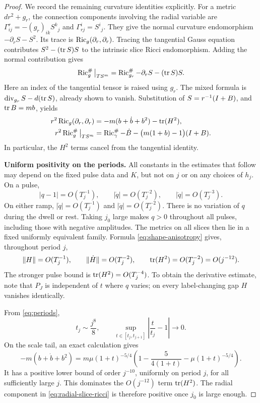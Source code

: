 \begin{proof}
We record the remaining curvature identities explicitly.
For a metric \(dr^2+g_r\), the connection components involving the
radial variable are
\(\Gamma^r_{ij}=-(g_r)_{ik}S^k{}_j\) and
\(\Gamma^i_{rj}=S^i{}_j\).
They give the normal curvature endomorphism
\(-\partial_rS-S^2\).  Its trace is \(\operatorname{Ric}_g(\partial_r,\partial_r)\).
Tracing the tangential Gauss equation contributes
\(S^2-(\operatorname{tr} S)S\) to the intrinsic slice Ricci endomorphism.
Adding the normal contribution gives
\[
 \operatorname{Ric}_g^\#\big|_{TS^m}
   =\operatorname{Ric}_{g_r}^\#-\partial_rS-(\operatorname{tr} S)S.
\]
Here an index of the tangential tensor is raised using \(g_r\).
The mixed formula is
\(\operatorname{div}_{g_r}S-d(\operatorname{tr} S)\), already shown to vanish.
Substitution of \(S=r^{-1}(I+B)\), and
\(\operatorname{tr} B=mb\), yields
\begin{equation}\label{eq:radial-slice-ricci}
 \begin{aligned}
  r^2\operatorname{Ric}_g(\partial_r,\partial_r)
     &=-m(b+\dot b+b^2)-\operatorname{tr}(H^2),\\
  r^2\operatorname{Ric}_g^\#\big|_{TS^m}
     &=\operatorname{Ric}_\gamma^\#-\dot B
       -\bigl(m(1+b)-1\bigr)(I+B).
 \end{aligned}
\end{equation}
In particular, the \(H^2\) terms cancel from the tangential identity.

\medskip\noindent
\textbf{Uniform positivity on the periods.}
All constants in the estimates that follow may depend on the fixed
pulse data and \(K\), but not on \(j\) or on any choices of \(h_j\).
On a pulse,
\[
 |q-1|=O(T_j^{-1}),\qquad
 |\dot q|=O(T_j^{-2}),\qquad
 |\ddot q|=O(T_j^{-3}).
\]
On either ramp, \(|\dot q|=O(T_j^{-1})\) and
\(|\ddot q|=O(T_j^{-2})\).
There is no variation of \(q\) during the dwell or rest.
Taking \(j_0\) large makes \(q>0\) throughout all pulses, including
those with negative amplitudes.
The metrics on all slices then lie in a fixed uniformly equivalent
family.  Formula \eqref{eq:shape-anisotropy} gives, throughout period
\(j\),
\[
 \|H\|=O(T_j^{-1}),\qquad
 \|\dot H\|=O(T_j^{-2}),\qquad
 \operatorname{tr}(H^2)=O(T_j^{-2})=O(j^{-12}).
\]
The stronger pulse bound is \(\operatorname{tr}(H^2)=O(T_j^{-4})\).
To obtain the derivative estimate, note that \(P_J\) is independent
of \(t\) where \(q\) varies; on every label-changing gap \(H\)
vanishes identically.

From \eqref{eq:periods},
\[
 t_j\sim\frac{j^8}{8},\qquad
 \sup_{t\in[t_j,t_{j+1}]}\left|\frac{t}{t_j}-1\right|\longrightarrow0.
\]
On the scale tail, an exact calculation gives
\[
 -m(b+\dot b+b^2)
 =m\mu(1+t)^{-5/4}
       \left(1-\frac{5}{4(1+t)}-\mu(1+t)^{-5/4}\right).
\]
It has a positive lower bound of order \(j^{-10}\), uniformly on
period \(j\), for all sufficiently large \(j\).
This dominates the \(O(j^{-12})\) term \(\operatorname{tr}(H^2)\).
The radial component in \eqref{eq:radial-slice-ricci} is therefore
positive once \(j_0\) is large enough.


\end{proof}
